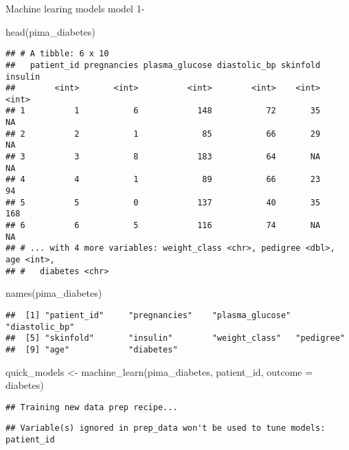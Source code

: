 \documentclass[
]{article}
\newenvironment{Shaded}{\begin{snugshade}}{\end{snugshade}}
\newcommand{\AttributeTok}[1]{\textcolor[rgb]{0.77,0.63,0.00}{#1}}
\newcommand{\FunctionTok}[1]{\textcolor[rgb]{0.00,0.00,0.00}{#1}}
\newcommand{\NormalTok}[1]{#1}
\newcommand{\OtherTok}[1]{\textcolor[rgb]{0.56,0.35,0.01}{#1}}
\begin{document}
Machine learing models model 1-

\begin{Shaded}
\begin{Highlighting}[]
\FunctionTok{head}\NormalTok{(pima\_diabetes)}
\end{Highlighting}
\end{Shaded}

\begin{verbatim}
## # A tibble: 6 x 10
##   patient_id pregnancies plasma_glucose diastolic_bp skinfold insulin
##        <int>       <int>          <int>        <int>    <int>   <int>
## 1          1           6            148           72       35      NA
## 2          2           1             85           66       29      NA
## 3          3           8            183           64       NA      NA
## 4          4           1             89           66       23      94
## 5          5           0            137           40       35     168
## 6          6           5            116           74       NA      NA
## # ... with 4 more variables: weight_class <chr>, pedigree <dbl>, age <int>,
## #   diabetes <chr>
\end{verbatim}

\begin{Shaded}
\begin{Highlighting}[]
\FunctionTok{names}\NormalTok{(pima\_diabetes)}
\end{Highlighting}
\end{Shaded}

\begin{verbatim}
##  [1] "patient_id"     "pregnancies"    "plasma_glucose" "diastolic_bp"  
##  [5] "skinfold"       "insulin"        "weight_class"   "pedigree"      
##  [9] "age"            "diabetes"
\end{verbatim}

\begin{Shaded}
\begin{Highlighting}[]
\NormalTok{quick\_models }\OtherTok{\textless{}{-}} \FunctionTok{machine\_learn}\NormalTok{(pima\_diabetes, patient\_id, }\AttributeTok{outcome =}\NormalTok{ diabetes)}
\end{Highlighting}
\end{Shaded}

\begin{verbatim}
## Training new data prep recipe...
\end{verbatim}

\begin{verbatim}
## Variable(s) ignored in prep_data won't be used to tune models: patient_id
\end{verbatim}
\end{document}

